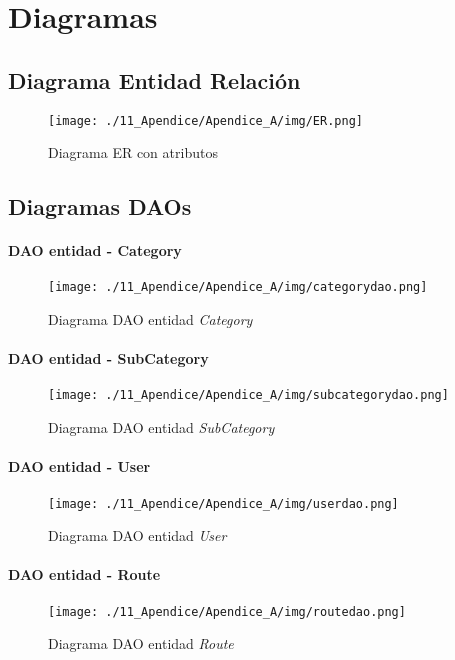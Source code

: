 \chapter[Diagramas]{
  \label{chp:diagramas}
  Diagramas
}
\thispagestyle{numberingStyle}
\pagestyle{numberingStyle}


\section{Diagrama Entidad Relación}
\begin{sidewaysfigure}[]
\texttt{[image: ./11\_Apendice/Apendice\_A/img/ER.png]}
\caption{Diagrama ER con atributos}
\end{sidewaysfigure}



\newpage
\section{Diagramas DAOs}

\subsubsection*{DAO entidad - Category}
\begin{figure}[H]
\centering
\texttt{[image: ./11\_Apendice/Apendice\_A/img/categorydao.png]}
\caption{Diagrama DAO entidad \textit{Category}}
\end{figure}


\subsubsection*{DAO entidad - SubCategory}
\begin{figure}[H]
\centering
\texttt{[image: ./11\_Apendice/Apendice\_A/img/subcategorydao.png]}
\caption{Diagrama DAO entidad \textit{SubCategory}}
\end{figure}


\subsubsection*{DAO entidad - User}
\begin{figure}[H]
\centering
\texttt{[image: ./11\_Apendice/Apendice\_A/img/userdao.png]}
\caption{Diagrama DAO entidad \textit{User}}
\end{figure}


\subsubsection*{DAO entidad - Route}
\begin{figure}[H]
\centering
\texttt{[image: ./11\_Apendice/Apendice\_A/img/routedao.png]}
\caption{Diagrama DAO entidad \textit{Route}}
\end{figure}


